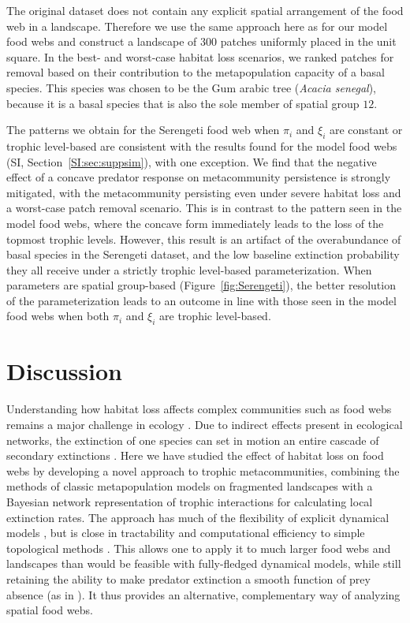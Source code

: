 \documentclass[11pt]{article}
\newcommand{\SI}{SI}
\begin{document}
The original dataset does not contain any explicit spatial arrangement of the food web in a landscape. Therefore we use the same approach here as for our model food webs and construct a landscape of $300$ patches uniformly placed in the unit square. In the best- and worst-case habitat loss scenarios, we ranked patches for removal based on their contribution to the metapopulation capacity of a basal species. This species was chosen to be the Gum arabic tree (\textit{Acacia senegal}), because it is a basal species that is also the sole member of spatial group $12$.

The patterns we obtain for the Serengeti food web when $\pi_i$ and $\xi_i$ are constant or trophic level-based are consistent with the results found for the model food webs (\SI, Section~\ref{SI:sec:suppsim}), with one exception. We find that the negative effect of a concave predator response on metacommunity persistence is strongly mitigated, with the metacommunity persisting even under severe habitat loss and a worst-case patch removal scenario. This is in contrast to the pattern seen in the model food webs, where the concave form immediately leads to the loss of the topmost trophic levels. However, this result is an artifact of the overabundance of basal species in the Serengeti dataset, and the low baseline extinction probability they all receive under a strictly trophic level-based parameterization. When parameters are spatial group-based (Figure~\ref{fig:Serengeti}), the better resolution of the parameterization leads to an outcome in line with those seen in the model food webs when both $\pi_i$ and $\xi_i$ are trophic level-based.


\section{Discussion} \label{sec:discussion}

Understanding how habitat loss affects complex communities such as food webs remains a major challenge in ecology \citep{Guzman2018, LeiboldChase2018}. Due to indirect effects present in ecological networks, the extinction of one species can set in motion an entire cascade of secondary extinctions \citep{EbenmanJonsson2005, Dunne2009}. Here we have studied the effect of habitat loss on food webs by developing a novel approach to trophic metacommunities, combining the methods of classic metapopulation models on fragmented landscapes \citep{HanskiOvaskainen2000, HanskiOvaskainen2003, OvaskainenHanski2001, Grillietal2015} with a Bayesian network representation of trophic interactions \citep{Eklofetal2013MEE} for calculating local extinction rates. The approach has much of the flexibility of explicit dynamical models \citep{Ryser2019}, but is close in tractability and computational efficiency to simple topological methods \citep{Dunne2009}. This allows one to apply it to much larger food webs and landscapes than would be feasible with fully-fledged dynamical models, while still retaining the ability to make predator extinction a smooth function of prey absence (as in \citealp{Cazellesetal2015}). It thus provides an alternative, complementary way of analyzing spatial food webs.
\end{document}
